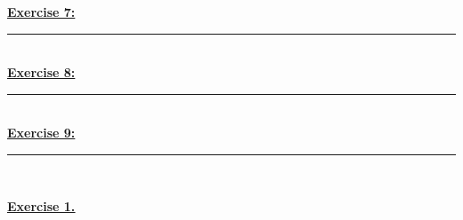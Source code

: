 \documentclass[12pt]{article}
\begin{document}
\noindent \hyperlink{7}{\textbf{Exercise 7:}}
\vspace{1mm}
\hrule
\vspace{1mm} \leavevmode \\

\noindent \hyperlink{8}{\textbf{Exercise 8:}}
\vspace{1mm}
\hrule
\vspace{1mm} \leavevmode \\

\noindent \hyperlink{9}{\textbf{Exercise 9:}}
\vspace{1mm}
\hrule
\vspace{1mm} \leavevmode \\

\newpage

\noindent \hyperlink{toc}{\hypertarget{1}{\LARGE \underline{\textbf{Exercise 1.}}}}\\\\
\end{document}

